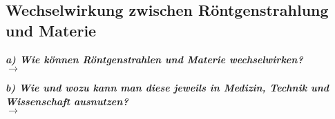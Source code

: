 \subsection{\label{subsec:FZV2}Wechselwirkung zwischen Röntgenstrahlung und Materie}
\textbf{\textit{a) Wie können Röntgenstrahlen und Materie wechselwirken?}}\\
$\rightarrow$

\textbf{\textit{b) Wie und wozu kann man diese jeweils in Medizin, Technik und Wissenschaft
ausnutzen?}}\\
$\rightarrow$